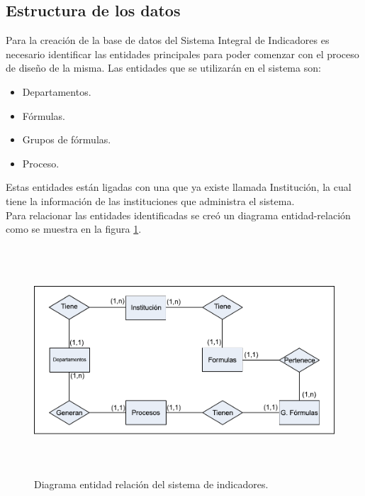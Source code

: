 		\subsection{Estructura de los datos}

			Para la creaci\'on de la base de datos del Sistema Integral de Indicadores es necesario identificar las entidades principales para poder comenzar con el proceso de dise\~no de la misma. Las entidades que se utilizar\'an en el sistema son:
			\begin{itemize}
				\item Departamentos.
				\item F\'ormulas.
				\item Grupos de f\'ormulas.
				\item Proceso.
			\end{itemize}

			Estas entidades est\'an ligadas con una que ya existe llamada Instituci\'on, la cual tiene la informaci\'on de las instituciones que administra el sistema.\\

			Para relacionar las entidades identificadas se cre\'o un diagrama entidad-relaci\'on como se muestra en la figura \ref{fig_DEntidadRel}.

			\begin{figure}[H]
		        \centering
		        \includegraphics[width=16cm, height=8.5cm]{figuras/DEntidadRel}
		        \caption{Diagrama entidad relaci\'on del sistema de indicadores.}
		        \label{fig_DEntidadRel}
		    \end{figure}


